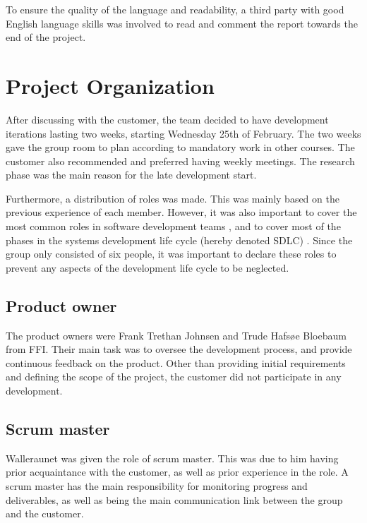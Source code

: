 To ensure the quality of the language and readability, a third party with good English language skills was involved to read and comment the report towards the end of the project.

\section{Project Organization}
\label{sec:process_and_methodology-project_organization}

After discussing with the customer, the team decided to have development iterations lasting two weeks, starting Wednesday 25th of February. The two weeks gave the group room to plan according to mandatory work in other courses. The customer also recommended and preferred having weekly meetings. The research phase was the main reason for the late development start.

Furthermore, a distribution of roles was made. This was mainly based on the previous experience of each member. However, it was also important to cover the most common roles in software development teams \cite{software-roles}, and to cover most of the phases in the systems development life cycle (hereby denoted SDLC) \cite{sdlc}. Since the group only consisted of six people, it was important to declare these roles to prevent any aspects of the development life cycle to be neglected.

\subsection{Product owner}
\label{subsec:process_and_methodology-project_organization-product_owner}

The product owners were Frank Trethan Johnsen and Trude Hafsøe Bloebaum from FFI. Their main task was to oversee the development process, and provide continuous feedback on the product. Other than providing initial requirements and defining the scope of the project, the customer did not participate in any development.

\subsection{Scrum master}
\label{subsec:process_and_methodology-project_organization-scrum_master}

Walleraunet was given the role of scrum master. This was due to him having prior acquaintance with the customer, as well as prior experience in the role. A scrum master has the main responsibility for monitoring progress and deliverables, as well as being the main communication link between the group and the customer.

